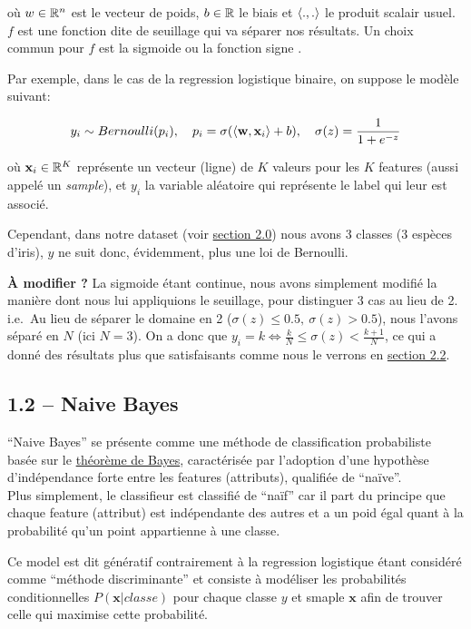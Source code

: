 \documentclass[
]{article}
\begin{document}
où \(w \in \mathbb{R}^n\) est le vecteur de poids, \(b \in \mathbb{R}\) le biais et
\(\langle ., . \rangle\) le produit scalair usuel. \(f\) est une fonction
dite de seuillage qui va séparer nos résultats. Un choix commun pour
\(f\) est la sigmoide ou la fonction signe
\cite{ClassifieurLineaire2022}.

Par exemple, dans le cas de la regression logistique binaire, on suppose
le modèle suivant:

\[
y_i \sim Bernoulli(p_i),\quad p_i = \sigma(\langle \mathbf{w}, \mathbf{x}_i \rangle + b),\quad \sigma(z) = \frac{1}{1 + e^{-z}}
\]

où \(\mathbf{x}_i \in \mathbb{R}^K\) représente un vecteur (ligne) de \(K\)
valeurs pour les \(K\) features (aussi appelé un \emph{sample}), et
\(y_i\) la variable aléatoire qui représente le label qui leur est
associé.

Cependant, dans notre dataset (voir
\href{#choix-du-dataset-outils-utilisuxe9s}{section 2.0}) nous avons 3
classes (3 espèces d'iris), \(y\) ne suit donc, évidemment, plus une loi
de Bernoulli.

\textbf{À modifier ?} La sigmoide étant continue, nous avons simplement
modifié la manière dont nous lui appliquions le seuillage, pour
distinguer 3 cas au lieu de 2. i.e.~Au lieu de séparer le domaine en 2
(\(\sigma(z) \leq 0.5,\ \sigma(z) > 0.5\)), nous l'avons séparé en \(N\)
(ici \(N = 3\)). On a donc que
\(y_i = k \Leftrightarrow \frac{k}{N} \leq \sigma(z) < \frac{k + 1}{N}\),
ce qui a donné des résultats plus que satisfaisants comme nous le
verrons en \href{#ruxe9gression-logistique-1}{section 2.2}.

\subsection{1.2 -- Naive Bayes}\label{naive-bayes}

``Naive Bayes'' se présente comme une méthode de classification
probabiliste basée sur le
\href{https://en.wikipedia.org/wiki/Bayes\%27_theorem}{théorème de
Bayes}, caractérisée par l'adoption d'une hypothèse d'indépendance forte
entre les features (attributs), qualifiée de ``naïve''.\\
Plus simplement, le classifieur est classifié de ``naïf'' car il part du
principe que chaque feature (attribut) est indépendante des autres et a
un poid égal quant à la probabilité qu'un point appartienne à une
classe.

Ce model est dit génératif contrairement à la regression logistique
étant considéré comme ``méthode discriminante''
\cite{ClassifieurLineaire2022} et consiste à modéliser les probabilités
conditionnelles \(P(\mathbf{x}| classe)\) pour chaque classe \(y\) et
smaple \(\mathbf{x}\) afin de trouver celle qui maximise cette
probabilité.
\end{document}
